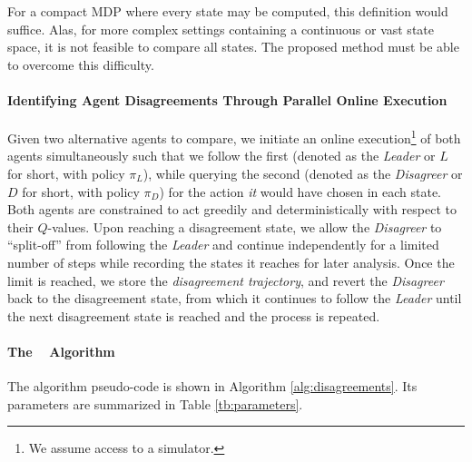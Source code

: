 For a compact MDP where every state may be computed, this definition would
suffice. Alas, for more complex settings containing a continuous or vast state
space, it is not feasible to compare all states. The proposed method must be
able to overcome this difficulty.

\paragraph{Identifying Agent Disagreements Through Parallel Online Execution}
Given two alternative agents to compare, we initiate an online execution\footnote{We assume access to a simulator.} of both
agents simultaneously such that we follow the first (denoted as the
\emph{Leader} or $L$ for short, with policy $\pi_{L}$), while querying the
second (denoted as the \emph{Disagreer} or $D$ for short, with policy $\pi_{D}$)
for the action \emph{it} would have chosen in each state. Both agents are
constrained to act greedily and deterministically with respect to their
$Q$-values. Upon reaching a disagreement state, we allow the \emph{Disagreer} to
``split-off'' from following the \emph{Leader} and continue independently for a
limited number of steps while recording the states it reaches for later
analysis. Once the limit is reached, we store the \emph{disagreement
trajectory}, and revert the \emph{Disagreer} back to the disagreement state,
from which it continues to follow the \emph{Leader} until the next disagreement
state is reached and the process is repeated.

\paragraph{The \disalg~ Algorithm}
The algorithm pseudo-code is shown in Algorithm \ref{alg:disagreements}. Its parameters are summarized in Table \ref{tb:parameters}. 

